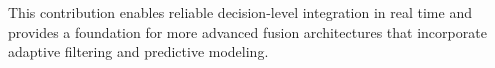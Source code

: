 \documentclass{erauthesis}
\begin{document}
This contribution enables reliable decision-level integration in real time and provides a foundation for more advanced fusion architectures that incorporate adaptive filtering and predictive modeling.





\end{document}
